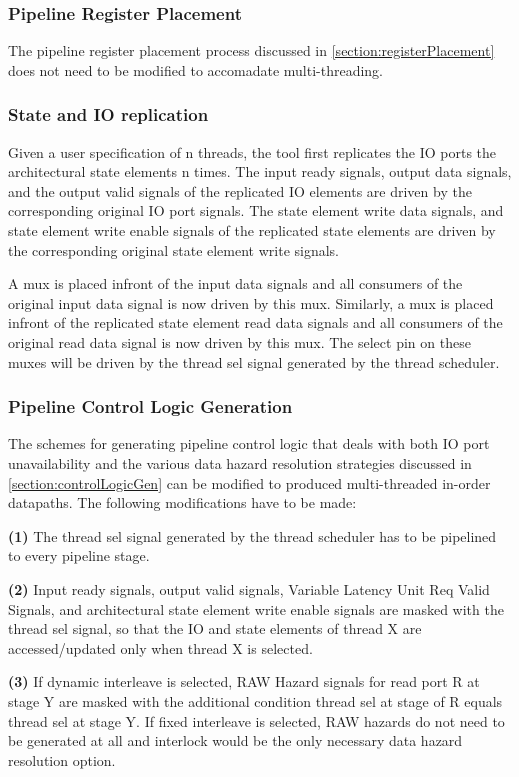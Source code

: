 \subsubsection{Pipeline Register Placement}
The pipeline register placement process discussed in \ref{section:registerPlacement} does not need to be modified to accomadate multi-threading.

\subsubsection{State and IO replication}
\label{sec:replication}
Given a user specification of n threads, the tool first replicates the IO ports the architectural state elements n times. The input ready signals, output data signals, and the output valid signals of the replicated IO elements are driven by the corresponding original IO port signals. The state element write data signals, and state element write enable signals of the replicated state elements are driven by the corresponding original state element write signals. 

A mux is placed infront of the input data signals and all consumers of the original input data signal is now driven by this mux. Similarly, a mux is placed infront of the replicated state element read data signals and all consumers of the original read data signal is now driven by this mux. The select pin on these muxes will be driven by the thread sel signal generated by the thread scheduler.

\subsubsection{Pipeline Control Logic Generation}
The schemes for generating pipeline control logic that deals with both IO port unavailability and the various data hazard resolution strategies discussed in \ref{section:controlLogicGen} can be modified to produced multi-threaded in-order datapaths. The following modifications have to be made:

{\bf (1)} The thread sel signal generated by the thread scheduler has to be pipelined to every pipeline stage.

{\bf (2)} Input ready signals, output valid signals, Variable Latency Unit Req Valid Signals, and architectural state element write enable signals are masked with the thread sel signal, so that the IO and state elements of thread X are accessed/updated only when thread X is selected.

{\bf (3)} If dynamic interleave is selected, RAW Hazard signals for read port R at stage Y are masked with the additional condition thread sel at stage of R equals thread sel at stage Y. If fixed interleave is selected, RAW hazards do not need to be generated at all and interlock would be the only necessary data hazard resolution option.

